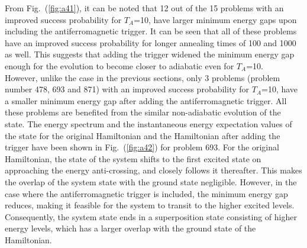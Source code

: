 \documentclass[../main.tex]{subfiles}
\begin{document}
From Fig.~(\ref{fig:a41}), it can be noted that 12 out of the 15 problems with an improved success probability for $T_A$=10, have larger minimum energy gaps upon including the antiferromagnetic trigger. It can be seen that all of these problems have an improved success probability for longer annealing times of 100 and 1000 as well. This suggests that adding the trigger widened the minimum energy gap enough for the evolution to become closer to adiabatic even for $T_A$=10.\\

However, unlike the case in the previous sections, only 3 problems (problem number 478, 693 and 871) with an improved success probability for $T_A$=10, have a smaller minimum energy gap after adding the antiferromagnetic trigger. All these problems are benefited from the similar non-adiabatic evolution of the state. The energy spectrum and the instantaneous energy expectation values of the state for the original Hamiltonian and the Hamiltonian after adding the trigger have been shown in Fig.~(\ref{fig:a42}) for problem 693. For the original Hamiltonian, the state of the system shifts to the first excited state on approaching the energy anti-crossing, and closely follows it thereafter. This makes the overlap of the system state with the ground state negligible. However, in the case where the antiferromagnetic trigger is included, the minimum energy gap reduces, making it feasible for the system to transit to the higher excited levels. Consequently, the system state ends in a superposition state consisting of higher energy levels, which has a larger overlap with the ground state of the Hamiltonian.
\end{document}
